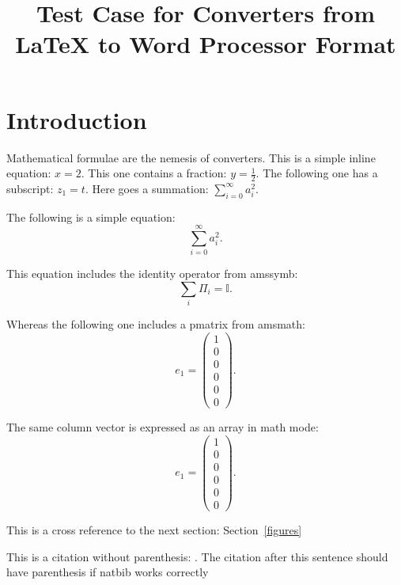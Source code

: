 \documentclass{article}
\title{Test Case for Converters from \LaTeX{} to Word Processor Format}
\author{}
\begin{document}
\maketitle

\section{Introduction}
Mathematical formulae are the nemesis of converters. This is a simple inline equation: $x=2$. This one contains a fraction: $y=\frac{1}{2}$. The following one has a subscript: $z_{1}=t$. Here goes a summation: $\sum_{i=0}^{\infty}a_{i}^{2}$.

The following is a simple equation:
\begin{equation}
  \sum_{i=0}^{\infty}a_{i}^{2}.
\end{equation}

This equation includes the identity operator from amssymb:
\begin{equation}
  \sum_{i}\Pi_{i}=\mathbb{I}.
\end{equation}

Whereas the following one includes a pmatrix from amsmath:
\begin{equation}
  e_{1}=\begin{pmatrix} 1 \\ 0 \\ 0 \\ 0 \\ 0 \\0 \end{pmatrix}.
\end{equation}

The same column vector is expressed as an array in math mode:
\begin{equation}
  e_{1}=\left(\begin{array}{c} 1 \\ 0 \\ 0 \\ 0 \\ 0 \\0 \end{array}\right).
\end{equation}

This is a cross reference to the next section: Section~\ref{figures}

This is a citation without parenthesis: \cite{dummy2013least}. The citation after this sentence should have parenthesis if natbib works correctly~\citep{dummy2013least}
\end{document}

